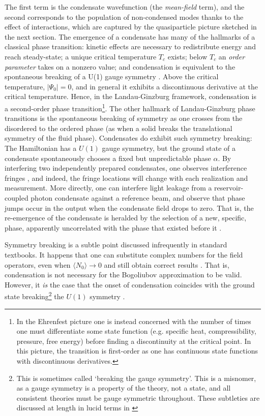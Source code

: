	The first term is the condensate wavefunction (the \emph{mean-field} term), and the second corresponds to the population of non-condensed modes thanks to the effect of interactions, which are captured by the quasiparticle picture sketched in the next section.	The emergence of a condensate has many of the hallmarks of a classical phase transition: kinetic effects are necessary to redistribute energy and reach steady-state; a unique critical temperature $T_c$ exists; below $T_c$ an \emph{order parameter} takes on a nonzero value; and condensation is equivalent to the spontaneous breaking of a U(1) gauge symmetry \cite{Yukalov11_symmetry}.
	Above the critical temperature, $|\Psi_0|=0$, and in general it exhibits a discontinuous derivative at the critical temperature.
	Hence, in the Landau-Ginzburg framework, condensation is a second-order phase transition\footnote{In the Ehrenfest picture one is instead concerned with the number of times one must differentiate some state function (e.g.
	specific heat, compressibility, pressure, free energy) before finding a discontinuity at the critical point.
	In this picture, the transition is first-order as one has continuous state functions with discontinuous derivatives.}.
	The other hallmark of Landau-Ginzburg phase transitions is the spontaneous breaking of symmetry as one crosses from the disordered to the ordered phase (as when a solid breaks the translational symmetry of the fluid phase).
	Condensates do exhibit such symmetry breaking: The Hamiltonian has a $U(1)$ gauge symmetry, but the ground state of a condensate spontaneously chooses a fixed but unpredictable phase $\alpha$.
	By interfering two independently prepared condensates, one observes interference fringes \cite{Andrews97}, and indeed, the fringe locations will change with each realization and measurement.
	More directly, one can interfere light leakage from a reservoir-coupled photon condensate against a reference beam, and observe that phase jumps occur in the output when the condensate field drops to zero.
	That is, the re-emergence of the condensate is heralded by the selection of a new, specific, phase, apparently uncorrelated with the phase that existed before it \cite{Schmitt16}.
	
	
	Symmetry breaking is a subtle point discussed infrequently in standard textbooks.
	It happens that one can substitute complex numbers for the field operators,  even when $\langle N_0\rangle \rightarrow 0$ and still obtain correct results \cite{Ginibre67}.
	That is, condensation is not necessary for the Bogoliubov approximation to be valid.
	However, it \emph{is} the case that the onset of condensation coincides with the ground state breaking\footnote{This is sometimes called `breaking the gauge symmetry'.
	This is a misnomer, as a gauge symmetry is a property of the theory, not a state, and all consistent theories must be gauge symmetric throughout.
	These subtleties are discussed at length in lucid terms in \cite{Poniatowski19}} the $U(1)$ symmetry \cite{Suto05} .
	
